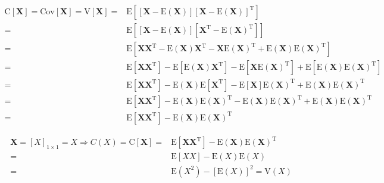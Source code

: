 \documentclass[
]{book}
\theoremstyle{definition}
\theoremstyle{definition}
\theoremstyle{definition}
\theoremstyle{definition}
\theoremstyle{remark}
\begin{document}
\begin{align*}
\mathrm{C}\left[\boldsymbol{X}\right]=\mathrm{Cov}\left[\boldsymbol{X}\right]=\mathrm{V}\left[\boldsymbol{X}\right]= & \mathrm{E}\left[\left[\boldsymbol{X}-\mathrm{E}\left(\boldsymbol{X}\right)\right]\left[\boldsymbol{X}-\mathrm{E}\left(\boldsymbol{X}\right)\right]^{\mathrm{T}}\right]\\
= & \mathrm{E}\left[\left[\boldsymbol{X}-\mathrm{E}\left(\boldsymbol{X}\right)\right]\left[\boldsymbol{X}^{\mathrm{T}}-\mathrm{E}\left(\boldsymbol{X}\right)^{\mathrm{T}}\right]\right]\\
= & \mathrm{E}\left[\boldsymbol{X}\boldsymbol{X}^{\mathrm{T}}-\mathrm{E}\left(\boldsymbol{X}\right)\boldsymbol{X}^{\mathrm{T}}-\boldsymbol{X}\mathrm{E}\left(\boldsymbol{X}\right)^{\mathrm{T}}+\mathrm{E}\left(\boldsymbol{X}\right)\mathrm{E}\left(\boldsymbol{X}\right)^{\mathrm{T}}\right]\\
= & \mathrm{E}\left[\boldsymbol{X}\boldsymbol{X}^{\mathrm{T}}\right]-\mathrm{E}\left[\mathrm{E}\left(\boldsymbol{X}\right)\boldsymbol{X}^{\mathrm{T}}\right]-\mathrm{E}\left[\boldsymbol{X}\mathrm{E}\left(\boldsymbol{X}\right)^{\mathrm{T}}\right]+\mathrm{E}\left[\mathrm{E}\left(\boldsymbol{X}\right)\mathrm{E}\left(\boldsymbol{X}\right)^{\mathrm{T}}\right]\\
= & \mathrm{E}\left[\boldsymbol{X}\boldsymbol{X}^{\mathrm{T}}\right]-\mathrm{E}\left(\boldsymbol{X}\right)\mathrm{E}\left[\boldsymbol{X}^{\mathrm{T}}\right]-\mathrm{E}\left[\boldsymbol{X}\right]\mathrm{E}\left(\boldsymbol{X}\right)^{\mathrm{T}}+\mathrm{E}\left(\boldsymbol{X}\right)\mathrm{E}\left(\boldsymbol{X}\right)^{\mathrm{T}}\\
= & \mathrm{E}\left[\boldsymbol{X}\boldsymbol{X}^{\mathrm{T}}\right]-\mathrm{E}\left(\boldsymbol{X}\right)\mathrm{E}\left(\boldsymbol{X}\right)^{\mathrm{T}}-\mathrm{E}\left(\boldsymbol{X}\right)\mathrm{E}\left(\boldsymbol{X}\right)^{\mathrm{T}}+\mathrm{E}\left(\boldsymbol{X}\right)\mathrm{E}\left(\boldsymbol{X}\right)^{\mathrm{T}}\\
= & \mathrm{E}\left[\boldsymbol{X}\boldsymbol{X}^{\mathrm{T}}\right]-\mathrm{E}\left(\boldsymbol{X}\right)\mathrm{E}\left(\boldsymbol{X}\right)^{\mathrm{T}}
\end{align*}

\begin{align*}
\boldsymbol{X}=\left[X\right]_{1\times1}=X\Rightarrow C\left(X\right)=\mathrm{C}\left[\boldsymbol{X}\right]= & \mathrm{E}\left[\boldsymbol{X}\boldsymbol{X}^{\mathrm{T}}\right]-\mathrm{E}\left(\boldsymbol{X}\right)\mathrm{E}\left(\boldsymbol{X}\right)^{\mathrm{T}}\\
= & \mathrm{E}\left[XX\right]-\mathrm{E}\left(X\right)\mathrm{E}\left(X\right)\\
= & \mathrm{E}\left(X^{2}\right)-\left[\mathrm{E}\left(X\right)\right]^{2}=\mathrm{V}\left(X\right)
\end{align*}
\end{document}
